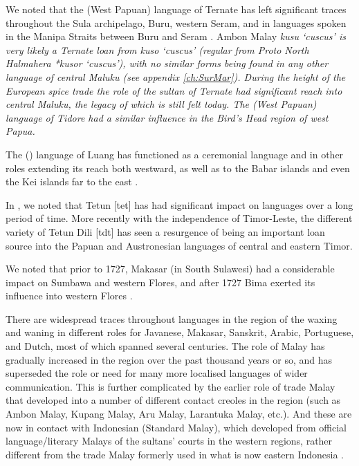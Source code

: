 We noted that the  (West Papuan) language
of Ternate has left significant traces throughout the Sula archipelago,
Buru, western Seram, and in languages spoken in the Manipa Straits
between Buru and Seram \citep{Collins1982b,Grimes1993}.
Ambon Malay \it{kusu} ‘cuscus’ is very likely a Ternate loan
from \it{kuso} ‘cuscus’ (regular from Proto North Halmahera *kusor
‘cuscus’), with no similar forms being found in any other language of central
Maluku (see appendix \ref{ch:SurMar}).
During the height of the European spice trade the role of the
sultan of Ternate had significant reach into central Maluku,
the legacy of which is still felt today.
The  (West Papuan) language of Tidore had
a similar influence in the Bird’s Head region of west Papua.

The  () language of Luang
has functioned as a ceremonial language
and in other roles extending its reach both westward,
as well as to the Babar islands
and even the Kei islands far to the east \citep[400, note 13]{Taber1993}.

In , we noted that Tetun [tet] has had significant
impact on  languages over a long period of time.
More recently with the independence of Timor-Leste,
the different variety of Tetun Dili [tdt] has seen a resurgence
of being an important loan source into the Papuan
and Austronesian languages of central and eastern Timor.

We noted that prior to 1727,
Makasar (in South Sulawesi) had a considerable impact on Sumbawa
and western Flores, and after 1727 Bima exerted its influence
into western Flores \citep{VerheijenGrimes1995}.

There are widespread traces throughout languages in the region
of the waxing and waning in different roles for Javanese,
Makasar, Sanskrit, Arabic, Portuguese,
and Dutch, most of which spanned several centuries.
The role of Malay has gradually increased in the region over
the past thousand years or so,
and has superseded the role or need for many more localised languages of wider communication.
This is further complicated by the earlier role of trade Malay
that developed into a number of different contact creoles in
the region (such as Ambon Malay,
Kupang Malay, Aru Malay, Larantuka Malay, etc.).
And these are now in contact with Indonesian (Standard Malay),
which developed from official language/literary Malays of the
sultans’ courts in the western regions,
rather different from the trade Malay formerly used in what is
now eastern Indonesia \citep{AdelaarPrentice1996,Grimes1991,Grimes1996,Prentice1978}.


